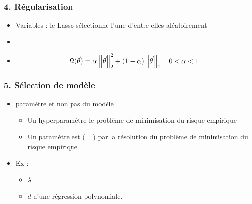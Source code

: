 \begin{frame}
  \frametitle{4. Régularisation}
  \begin{itemize}
  \item Variables  : le Lasso sélectionne l'une d'entre elles aléatoirement
  \item[$\Rightarrow$] 
  \item {}
    \[
      \Omega(\vec{\theta}) = \alpha \left|\left|\vec{\theta}\right|\right|_2^2 + (1-\alpha) \left|\left|\vec{\theta}\right|\right|_1 \hspace{1em} 0 < \alpha < 1       \]
    \end{itemize}
\end{frame}

\begin{frame}
  \frametitle{5. Sélection de modèle}
  \begin{itemize}
  \item {} paramètre  et non pas du modèle
    \begin{itemize}
    \item Un hyperparamètre  le problème de minimisation du
      risque empirique
    \item Un paramètre est  (= ) par la résolution du problème de minimisation du risque empirique 
    \end{itemize}
  \item Ex :
    \begin{itemize}
    \item {} $\lambda$
    \item {} $d$ d'une régression polynomiale.
    \end{itemize}
  \end{itemize}
\end{frame}


